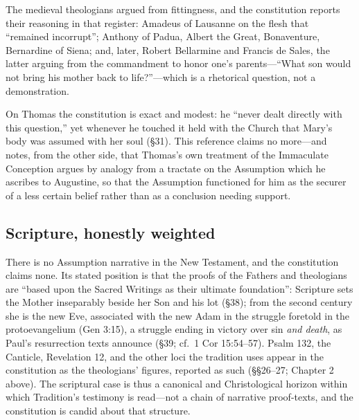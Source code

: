 The medieval theologians argued from fittingness, and the constitution
reports their reasoning in that register: Amadeus of Lausanne on the
flesh that ``remained incorrupt''; Anthony of Padua, Albert the Great,
Bonaventure, Bernardine of Siena; and, later, Robert Bellarmine and
Francis de Sales, the latter arguing from the commandment to honor one's
parents---``What son would not bring his mother back to life?''---which
is a rhetorical question, not a demonstration.

On Thomas the constitution is exact and modest: he ``never dealt directly
with this question,'' yet whenever he touched it held with the Church
that Mary's body was assumed with her soul (\S31). This reference claims
no more---and notes, from the other side, that Thomas's own treatment of
the Immaculate Conception argues by analogy from a tractate on the
Assumption which he ascribes to Augustine, so that the Assumption
functioned for him as the securer of a less certain belief rather than as
a conclusion needing support.

\subsection*{Scripture, honestly weighted}

There is no Assumption narrative in the New Testament, and the
constitution claims none. Its stated position is that the proofs of the
Fathers and theologians are ``based upon the Sacred Writings as their
ultimate foundation'': Scripture sets the Mother inseparably beside her
Son and his lot (\S38); from the second century she is the new Eve,
associated with the new Adam in the struggle foretold in the
protoevangelium (Gen 3:15), a struggle ending in victory over sin
\emph{and death}, as Paul's resurrection texts announce (\S39; cf.\ 1 Cor
15:54--57). Psalm 132, the Canticle, Revelation 12, and the other loci
the tradition uses appear in the constitution as the theologians'
figures, reported as such (\S\S26--27; Chapter 2 above). The scriptural
case is thus a canonical and Christological horizon within which
Tradition's testimony is read---not a chain of narrative proof-texts, and
the constitution is candid about that structure.

